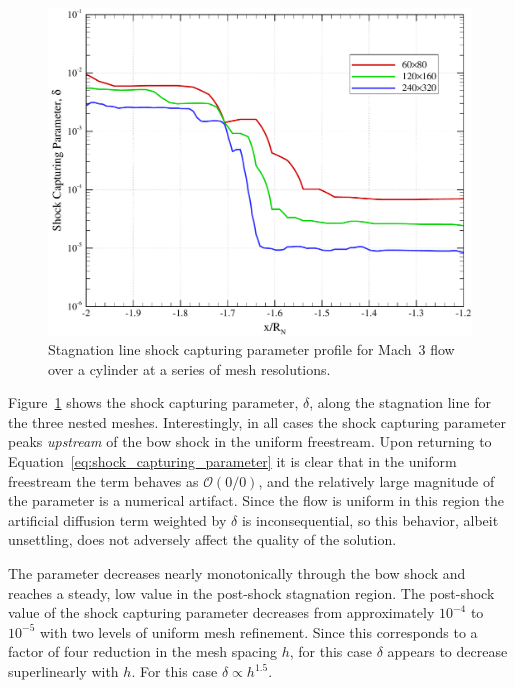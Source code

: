 \begin{figure}[hbtp]
  \begin{center}
    \includegraphics[width=\textwidth]{figures/mach3_cylinder/delta_mesh_convergence}
    \caption{Stagnation line shock capturing parameter profile for Mach~3 flow over a cylinder at a series of mesh resolutions.\label{fig:cyl_deltaconv}}
  \end{center}
\end{figure}

Figure~\ref{fig:cyl_deltaconv} shows the shock capturing parameter, $\delta$, along the stagnation line for the three nested meshes.  Interestingly, in all cases the shock capturing parameter peaks \emph{upstream} of the bow shock in the uniform freestream.  Upon returning to Equation~\eqref{eq:shock_capturing_parameter} it is clear that in the uniform freestream the term behaves as $\mathcal{O}(0/0)$, and the relatively large magnitude of the parameter is a numerical artifact.  Since the flow is uniform in this region the artificial diffusion term weighted by $\delta$ is inconsequential, so this behavior, albeit unsettling, does not adversely affect the quality of the solution.

The parameter decreases nearly monotonically through the bow shock and reaches a steady, low value in the post-shock stagnation region.  The post-shock value of the shock capturing parameter decreases from approximately $10^{-4}$ to $10^{-5}$ with two levels of uniform mesh refinement.  Since this corresponds to a factor of four reduction in the mesh spacing $h$, for this case $\delta$ appears to decrease superlinearly with $h$.  For this case $\delta\propto h^{1.5}$.

